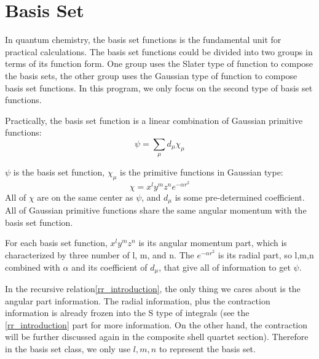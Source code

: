 % 
%
%
%

\section{Basis Set}
%
%
\label{bs}

In quantum chemistry, the basis set functions is the fundamental 
unit for practical calculations\cite{Davidson_Feller_CR_86_681_1986}. 
The basis set functions could be 
divided into two groups in terms of its function form. One group
uses the Slater type of function to compose the basis sets, 
the other group uses the Gaussian type of function to compose 
basis set functions. In this program, we only focus on the 
second type of basis set functions.

Practically, the basis set function is a linear combination of 
Gaussian primitive functions:
\begin{equation}
	\psi = \sum_{\mu}d_{\mu}\chi_{\mu}
\end{equation}

$\psi$ is the basis set function, $\chi_{\mu}$ is the primitive 
functions in Gaussian type:
\begin{equation}\label{gaussian_function}
	\chi = x^{l}y^{m}z^{n}e^{-\alpha r^{2}}
\end{equation}
All of $\chi$ are on the same center as $\psi$, and $d_{\mu}$ is 
some pre-determined coefficient. All of Gaussian primitive 
functions share the same angular momentum with the basis set
function.

For each basis set function, $x^{l}y^{m}z^{n}$ is its angular momentum part,
which is characterized by three number of l, m, and n. The $e^{-\alpha r^{2}}$
is its radial part, so l,m,n combined with $\alpha$ and its coefficient of
$d_{\mu}$, that give all of information to get $\psi$.

In the recursive relation\ref{rr_introduction}, the only thing we cares about 
is the angular part information. The radial information, plus the contraction 
information is already frozen into the S type of integrals (see the 
\ref{rr_introduction} part for more information. On the other hand, the 
contraction will be further discussed again in the
composite shell quartet section). Therefore in the basis set class, we only use $l,m,n$
to represent the basis set.

